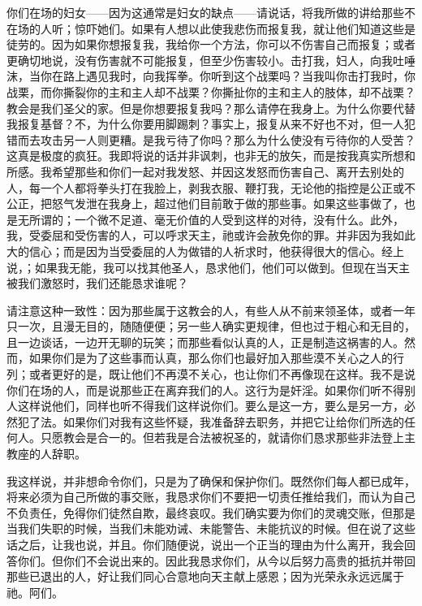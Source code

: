 你们在场的妇女——因为这通常是妇女的缺点——请说话，将我所做的讲给那些不在场的人听；惊吓她们。如果有人想以此使我悲伤而报复我，就让他们知道这些是徒劳的。因为如果你想报复我，我给你一个方法，你可以不伤害自己而报复；或者更确切地说，没有伤害就不可能报复，但至少伤害较小。击打我，妇人，向我吐唾沫，当你在路上遇见我时，向我挥拳。你听到这个战栗吗？当我叫你击打我时，你战栗，而你撕裂你的主和主人却不战栗？你撕扯你的主和主人的肢体，却不战栗？教会是我们圣父的家。但是你想要报复我吗？那么请停在我身上。为什么你要代替我报复基督？不，为什么你要用脚踢刺？事实上，报复从来不好也不对，但一人犯错而去攻击另一人则更糟。是我亏待了你吗？那么为什么使没有亏待你的人受苦？这真是极度的疯狂。我即将说的话并非讽刺，也非无的放矢，而是按我真实所想和所感。我希望那些和你们一起对我发怒、并因这发怒而伤害自己、离开去别处的人，每一个人都将拳头打在我脸上，剥我衣服、鞭打我，无论他的指控是公正或不公正，把怒气发泄在我身上，超过他们目前敢于做的那些事。如果这些事做了，也是无所谓的；一个微不足道、毫无价值的人受到这样的对待，没有什么。此外，我，受委屈和受伤害的人，可以呼求天主，祂或许会赦免你的罪。并非因为我如此大的信心；而是因为当受委屈的人为做错的人祈求时，他获得很大的信心。经上说，；如果我无能，我可以找其他圣人，恳求他们，他们可以做到。但现在当天主被我们激怒时，我们还能恳求谁呢？\par

请注意这种一致性：因为那些属于这教会的人，有些人从不前来领圣体，或者一年只一次，且漫无目的，随随便便；另一些人确实更规律，但也过于粗心和无目的，且一边谈话，一边开无聊的玩笑；而那些看似认真的人，正是制造这祸害的人。然而，如果你们是为了这些事而认真，那么你们也最好加入那些漠不关心之人的行列；或者更好的是，既让他们不再漠不关心，也让你们不再像现在这样。我不是说你们在场的人，而是说那些正在离弃我们的人。这行为是奸淫。如果你们听不得别人这样说他们，同样也听不得我们这样说你们。要么是这一方，要么是另一方，必然犯了法。如果你们对我有这些怀疑，我准备辞去职务，并把它让给你们所选的任何人。只愿教会是合一的。但若我是合法被祝圣的，就请你们恳求那些非法登上主教座的人辞职。\par

我这样说，并非想命令你们，只是为了确保和保护你们。既然你们每人都已成年，将来必须为自己所做的事交账，我恳求你们不要把一切责任推给我们，而认为自己不负责任，免得你们徒然自欺，最终哀叹。我们确实要为你们的灵魂交账，但那是当我们失职的时候，当我们未能劝诫、未能警告、未能抗议的时候。但在说了这些话之后，让我也说，并且。你们随便说，说出一个正当的理由为什么离开，我会回答你们。但你们不会说出来的。因此我恳求你们，从今以后努力高贵的抵抗并带回那些已退出的人，好让我们同心合意地向天主献上感恩；因为光荣永永远远属于祂。阿们。\par

